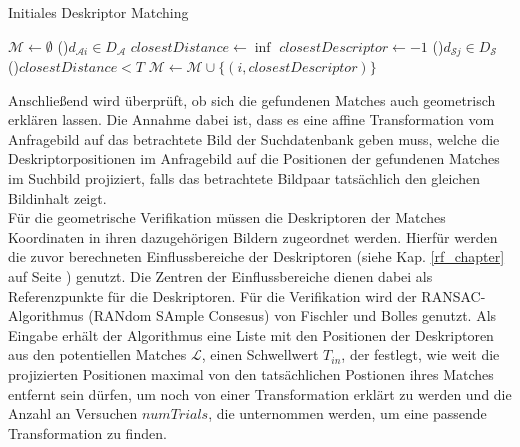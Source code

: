 \begin{algorithm}[h]
\caption{Initiales Deskriptor Matching}
\label{descmatch}
\DontPrintSemicolon
{}
$\mathcal{M} \leftarrow \emptyset$ \;
 \ForEach(){$d_{\mathcal{A}i} \in D_\mathcal{A}$}{
	$closestDistance \leftarrow \inf$ \;
	$closestDescriptor \leftarrow -1$ \;
  \ForEach(){$d_{\mathcal{S}j} \in D_\mathcal{S}$}{ 
   }
  \If(){$closestDistance < T$}{
  $\mathcal{M} \leftarrow \mathcal{M}\cup \{(i,closestDescriptor)\}$ 
  }
 }
\end{algorithm}
Anschließend wird überprüft, ob sich die gefundenen Matches auch geometrisch erklären lassen. Die Annahme dabei ist, dass es eine affine Transformation vom Anfragebild auf das betrachtete Bild der Suchdatenbank geben muss, welche die Deskriptorpositionen im Anfragebild auf die Positionen der gefundenen Matches im Suchbild projiziert, falls das betrachtete Bildpaar tatsächlich den gleichen Bildinhalt zeigt.
\\
Für die geometrische Verifikation müssen die Deskriptoren der Matches Koordinaten in ihren dazugehörigen Bildern zugeordnet werden. Hierfür werden die zuvor berechneten Einflussbereiche der Des\-kriptoren (siehe Kap. \ref{rf_chapter} auf Seite \pageref{rf_chapter}) genutzt. Die Zentren der Einflussbereiche dienen dabei als Referenzpunkte für die Deskriptoren. Für die Verifikation wird der RANSAC-Algorithmus (RANdom SAmple Consesus) \cite{ransac} von Fischler und Bolles genutzt. Als Eingabe erhält der Algorithmus eine Liste mit den Positionen der Deskriptoren aus den potentiellen Matches $\mathcal{L}$, einen Schwellwert $T_{in}$, der festlegt, wie weit die projizierten Positionen maximal von den tatsächlichen Postionen ihres Matches entfernt sein dürfen, um noch von einer Transformation erklärt zu werden und die Anzahl an Versuchen $numTrials$, die unternommen werden, um eine passende Transformation zu finden.\\
